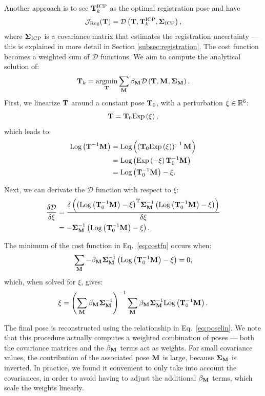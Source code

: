 Another approach is to see $\mathbf{T}_k^{\text{ICP}}$ as the optimal registration pose and have
\begin{equation}
	\mathcal{J}_{\text{Reg}}(\mathbf{T}) = \mathcal{D}\left({\mathbf{T}, \mathbf{T}_k^{\text{ICP}}, \mathbf{\Sigma}_{\text{ICP}}}\right)
	\text{,}
\end{equation}
where $\mathbf{\Sigma}_{\text{ICP}}$ is a covariance matrix that estimates the registration uncertainty --- this is explained in more detail in Section \ref{subsec:registration}. The cost function becomes a weighted sum of $\mathcal{D}$ functions. We aim to compute the analytical solution of:
\newcommand{\betaM}{\beta_{\Mtx{}}}
\begin{equation}
	\label{eq:costfn}
	\pose_k = \underset{\matx{T}}{\text{argmin}}
	\sum_{\Mtx{}} \betaM\dfunc{\pose, \Mtx{}, \CovM}
	\eqdot
\end{equation}
First, we linearize $\mathbf{T}$ around a constant pose $\mathbf{T}_0$, with a perturbation $\xi \in {\mathbb{R}}^6$:
\begin{equation}
	\label{eq:poselin}
	\mathbf{T} = \mathbf{T}_0 \text{Exp}\left({\xi}\right)
	\text{,}
\end{equation}
which leads to:
\begin{align}
	\text{Log}\left({\mathbf{T}^{-1} \mathbf{M}_{}}\right)
	 & = \text{Log}\left({\left(\mathbf{T}_0 \text{Exp}\left({\xi}\right)\right)^{-1} \mathbf{M}_{}}\right) \\
	 & =	\text{Log}\left({\text{Exp}\left({-\xi}\right)\mathbf{T}_0^{-1} \mathbf{M}_{}}\right)               \\
	 & =  \text{Log}\left({\mathbf{T}_0^{-1} \mathbf{M}_{}}\right) - \xi
	\text{.}
\end{align}

Next, we can derivate the $\mathcal{D}$ function with respect to $\xi$:
\begin{align}
	\frac{\delta \mathcal{D}}{\delta\xi}
	 & = \frac{\delta \left({\left(\text{Log}\left({\mathbf{T}_0^{-1} \mathbf{M}_{}}\right) - \xi\right)}^\text{T} \mathbf{\Sigma}_{\mathbf{M}}^{-1} \left(\text{Log}\left({\mathbf{T}_0^{-1} \mathbf{M}_{}}\right) - \xi\right)\right)}{\delta\xi} \\
	 & = -\mathbf{\Sigma}_{\mathbf{M}}^{-1}\left(\text{Log}\left({\mathbf{T}_0^{-1} \mathbf{M}_{}}\right) - \xi\right)
	\text{.}
\end{align}

The minimum of the cost function in Eq.~\ref{eq:costfn} occurs when:
\begin{equation}
	\sum_{\Mtx{}} -\betaM \CovM^{-1}\customreslin = 0
	\comma
\end{equation}
which, when solved for $\xi$, gives:
\begin{equation}
	\xi = \left(\sum_{\Mtx{}}\betaM\CovM^{-1}\right)^{-1}
	\sum_{\Mtx{}}\betaM\CovM^{-1}\customreslinnoxi
	\eqdot
\end{equation}

The final pose is reconstructed using the relationship in Eq.~\ref{eq:poselin}. We note that this procedure actually computes a weighted combination of poses --- both the covariance matrices and the $\betaM$ terms act as weights. For small covariance values, the contribution of the associated pose $\mathbf{M}_{}$ is large, because $\mathbf{\Sigma}_{\mathbf{M}}$ is inverted. In practice, we found it convenient to only take into account the covariances, in order to avoid having to adjust the additional $\betaM$ terms, which scale the weights linearly.





